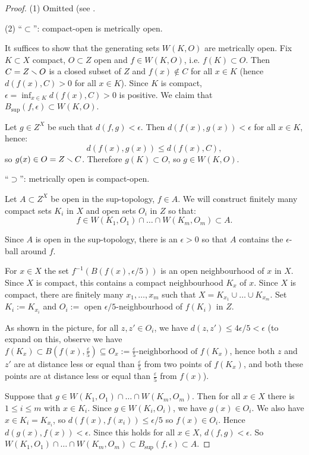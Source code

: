 \begin{proof}
(1) Omitted (see \cite[Proposition A.13]{hatcher}.

(2) \enquote{$\subset$}: compact-open is metrically open.

It suffices to show that the generating sets $W(K,O)$ are metrically open. Fix $K\subset X$ compact, $O\subset Z$ open and $f\in W(K,O)$, i.e. $f(K)\subset O$. Then $C=Z\smallsetminus O$ is a closed subset of $Z$ and $f(x)\not\in C$ for all $x\in K$ (hence $d(f(x),C)>0$ for all $x\in K$). Since $K$ is compact, $\epsilon=\inf_{x\in K}d(f(x),C)>0$
is positive.
We claim that $B_{\sup}(f,\epsilon)\subset W(K,O)$.

Let $g\in Z^X$ be such that $d(f,g)<\epsilon$. Then $d(f(x),g(x))<\epsilon$ for all $x\in K$, hence:
\[d(f(x),g(x))\leq d(f(x),C),\]
so $g(x)\in O=Z\smallsetminus C$. Therefore $g(K)\subset O$, so $g\in W(K,O)$.

\enquote{$\supset$}: metrically open is compact-open.

Let $A\subset Z^X$ be open in the sup-topology, $f\in A$. We will construct finitely many compact sets $K_i$ in $X$ and open sets $O_i$ in $Z$ so that:
\[f\in W(K_1,O_1)\cap\dots\cap W(K_m,O_m)\subset A.\]

Since $A$ is open in the sup-topology, there is an $\epsilon>0$ so that $A$ contains the $\epsilon$-ball around $f$.

For $x\in X$ the set $f^{-1}(B(f(x),\epsilon/5))$ is an open neighbourhood of $x$ in $X$. Since $X$ is compact, this contains a compact neighbourhood $K_x$ of $x$. Since $X$ is compact, there are finitely many $x_1,\dots,x_m$ such that $X=K_{x_1}\cup\dots\cup K_{x_m}$.
Set $K_i:=K_{x_i}$ and $O_i:=$ open $\epsilon/5$-neighbourhood of $f(K_i)$ in $Z$.


As shown in the picture, for all $z,z'\in O_i$, we have $d(z,z')\leq 4\epsilon/5<\epsilon$ (to expand on this, observe we have $f(K_x) \subset B(f(x),\frac{\varepsilon}{5})\subseteq O_x := \frac{\varepsilon}{5}\text{-neighborhood of }f(K_x)$, hence both $z$ and $z'$ are at distance less or equal than $\frac{\varepsilon}{5}$ from two points of $f(K_x)$, and both these points are at distance less or equal than $\frac{\varepsilon}{5}$ from $f(x)$).

Suppose that $g\in W(K_1,O_1)\cap\dots\cap W(K_m,O_m)$. Then for all $x\in X$ there is $1\leq i\leq m$ with $x\in K_i$. Since $g\in W(K_i,O_i)$, we have $g(x)\in O_i$. We also have $x\in K_i=K_{x_i}$, so $d(f(x),f(x_i))\leq\epsilon/5$ so $f(x)\in O_i$. Hence $d(g(x),f(x))<\epsilon$. Since this holds for all $x\in X$, $d(f,g)<\epsilon$. So $W(K_1,O_1)\cap\dots\cap W(K_m,O_m)\subset B_{\sup}(f,\epsilon)\subset A$.
\end{proof}
